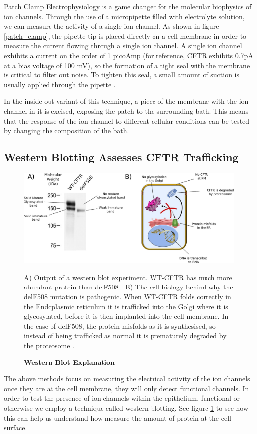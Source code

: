 Patch Clamp Electrophysiology is a game changer for the molecular biophysics of ion channels. Through the use of a micropipette filled with electrolyte solution, we can measure the activity of a single ion channel. As shown in figure \ref{patch_clamp}, the pipette tip is placed directly on a cell membrane in order to measure the current flowing through a single ion channel. A single ion channel exhibits a current on the order of 1 picoAmp (for reference, CFTR exhibits 0.7pA at a bias voltage of 100 mV), so the formation of a tight seal with the membrane is critical to filter out noise. To tighten this seal, a small amount of suction is usually applied through the pipette \cite{aidley1996}.

In the inside-out variant of this technique, a piece of the membrane with the ion channel in it is excised, exposing the patch to the surrounding bath. This means that the response of the ion channel to different cellular conditions can be tested by changing the composition of the bath. 

\subsection{Western Blotting Assesses CFTR Trafficking}
\begin{figure}
	\label{western_blot}
	\begin{center}
	\includegraphics[width=1\textwidth]{figures/western_blot_explanation.pdf}
	\end{center}
	\captionsetup{singlelinecheck = false, justification=raggedright}
	\caption[Western Blot Explanation] {\textbf{Western Blot Explanation}}{A) Output of a western blot experiment. WT-CFTR has much more abundant protein than delF508 \cite{chang2008}. B) The cell biology behind why the delF508 mutation is pathogenic. When WT-CFTR folds correctly in the Endoplasmic reticulum it is trafficked into the Golgi where it is glycosylated, before it is then implanted into the cell membrane. In the case of delF508, the protein misfolds as it is synthesised, so instead of being trafficked as normal it is prematurely degraded by the proteosome \cite{lopes-pacheco2016a}.} 
\end{figure}
The above methods focus on measuring the electrical activity of the ion channels once they are at the cell membrane, they will only detect functional channels. In order to test the presence of ion channels within the epithelium, functional or otherwise we employ a technique called western blotting. See figure \ref{western_blot} to see how this can help us understand how measure the amount of protein at the cell surface. 

